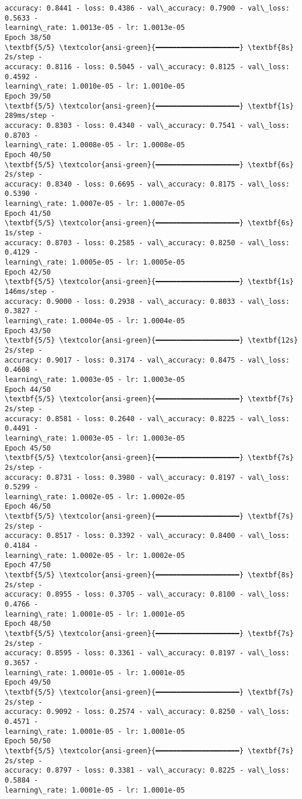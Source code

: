 \documentclass[11pt]{article}
\begin{document}
\begin{Verbatim}[commandchars=\\\{\}]
accuracy: 0.8441 - loss: 0.4386 - val\_accuracy: 0.7900 - val\_loss: 0.5633 -
learning\_rate: 1.0013e-05 - lr: 1.0013e-05
Epoch 38/50
\textbf{5/5} \textcolor{ansi-green}{━━━━━━━━━━━━━━━━━━━━} \textbf{8s} 2s/step -
accuracy: 0.8116 - loss: 0.5045 - val\_accuracy: 0.8125 - val\_loss: 0.4592 -
learning\_rate: 1.0010e-05 - lr: 1.0010e-05
Epoch 39/50
\textbf{5/5} \textcolor{ansi-green}{━━━━━━━━━━━━━━━━━━━━} \textbf{1s} 289ms/step -
accuracy: 0.8303 - loss: 0.4340 - val\_accuracy: 0.7541 - val\_loss: 0.8703 -
learning\_rate: 1.0008e-05 - lr: 1.0008e-05
Epoch 40/50
\textbf{5/5} \textcolor{ansi-green}{━━━━━━━━━━━━━━━━━━━━} \textbf{6s} 2s/step -
accuracy: 0.8340 - loss: 0.6695 - val\_accuracy: 0.8175 - val\_loss: 0.5390 -
learning\_rate: 1.0007e-05 - lr: 1.0007e-05
Epoch 41/50
\textbf{5/5} \textcolor{ansi-green}{━━━━━━━━━━━━━━━━━━━━} \textbf{6s} 1s/step -
accuracy: 0.8703 - loss: 0.2585 - val\_accuracy: 0.8250 - val\_loss: 0.4129 -
learning\_rate: 1.0005e-05 - lr: 1.0005e-05
Epoch 42/50
\textbf{5/5} \textcolor{ansi-green}{━━━━━━━━━━━━━━━━━━━━} \textbf{1s} 146ms/step -
accuracy: 0.9000 - loss: 0.2938 - val\_accuracy: 0.8033 - val\_loss: 0.3827 -
learning\_rate: 1.0004e-05 - lr: 1.0004e-05
Epoch 43/50
\textbf{5/5} \textcolor{ansi-green}{━━━━━━━━━━━━━━━━━━━━} \textbf{12s} 2s/step -
accuracy: 0.9017 - loss: 0.3174 - val\_accuracy: 0.8475 - val\_loss: 0.4608 -
learning\_rate: 1.0003e-05 - lr: 1.0003e-05
Epoch 44/50
\textbf{5/5} \textcolor{ansi-green}{━━━━━━━━━━━━━━━━━━━━} \textbf{7s} 2s/step -
accuracy: 0.8581 - loss: 0.2640 - val\_accuracy: 0.8225 - val\_loss: 0.4491 -
learning\_rate: 1.0003e-05 - lr: 1.0003e-05
Epoch 45/50
\textbf{5/5} \textcolor{ansi-green}{━━━━━━━━━━━━━━━━━━━━} \textbf{7s} 2s/step -
accuracy: 0.8731 - loss: 0.3980 - val\_accuracy: 0.8197 - val\_loss: 0.5299 -
learning\_rate: 1.0002e-05 - lr: 1.0002e-05
Epoch 46/50
\textbf{5/5} \textcolor{ansi-green}{━━━━━━━━━━━━━━━━━━━━} \textbf{7s} 2s/step -
accuracy: 0.8517 - loss: 0.3392 - val\_accuracy: 0.8400 - val\_loss: 0.4184 -
learning\_rate: 1.0002e-05 - lr: 1.0002e-05
Epoch 47/50
\textbf{5/5} \textcolor{ansi-green}{━━━━━━━━━━━━━━━━━━━━} \textbf{8s} 2s/step -
accuracy: 0.8955 - loss: 0.3705 - val\_accuracy: 0.8100 - val\_loss: 0.4766 -
learning\_rate: 1.0001e-05 - lr: 1.0001e-05
Epoch 48/50
\textbf{5/5} \textcolor{ansi-green}{━━━━━━━━━━━━━━━━━━━━} \textbf{7s} 2s/step -
accuracy: 0.8595 - loss: 0.3361 - val\_accuracy: 0.8197 - val\_loss: 0.3657 -
learning\_rate: 1.0001e-05 - lr: 1.0001e-05
Epoch 49/50
\textbf{5/5} \textcolor{ansi-green}{━━━━━━━━━━━━━━━━━━━━} \textbf{7s} 2s/step -
accuracy: 0.9092 - loss: 0.2574 - val\_accuracy: 0.8250 - val\_loss: 0.4571 -
learning\_rate: 1.0001e-05 - lr: 1.0001e-05
Epoch 50/50
\textbf{5/5} \textcolor{ansi-green}{━━━━━━━━━━━━━━━━━━━━} \textbf{7s} 2s/step -
accuracy: 0.8797 - loss: 0.3381 - val\_accuracy: 0.8225 - val\_loss: 0.5884 -
learning\_rate: 1.0001e-05 - lr: 1.0001e-05
    \end{Verbatim}
\end{document}
